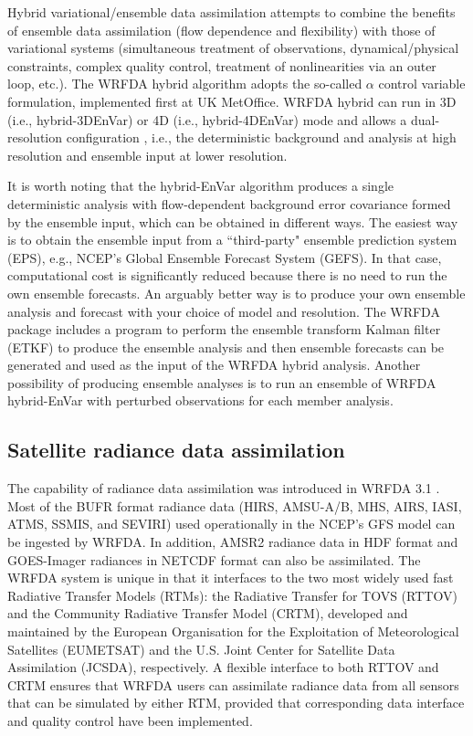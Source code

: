 Hybrid variational/ensemble data assimilation attempts to combine the benefits of ensemble data assimilation 
(flow dependence and flexibility) with those of variational systems (simultaneous treatment of observations,
dynamical/physical constraints, complex quality control, treatment of nonlinearities via an outer
loop, etc.). The WRFDA hybrid algorithm \citep{wang08a, wang08b} adopts the so-called $\alpha$ control variable formulation, 
implemented first at UK MetOffice. WRFDA hybrid can run in 3D (i.e., hybrid-3DEnVar) or 
4D (i.e., hybrid-4DEnVar) mode and allows a dual-resolution configuration \citep{schwartz15}, i.e., the deterministic
background and analysis at high resolution and ensemble input at lower resolution. 

It is worth noting that the hybrid-EnVar algorithm produces a single deterministic analysis with flow-dependent background
error covariance formed by the ensemble input, which can be obtained in different ways.
The easiest way is to obtain the ensemble input from a ``third-party" ensemble prediction system (EPS), e.g.,
NCEP's Global Ensemble Forecast System (GEFS). In that case, computational cost is significantly reduced
because there is no need to run the own ensemble forecasts.
An arguably better way is to produce your own ensemble analysis and forecast with your choice of model and resolution.
The WRFDA package includes a program to perform the ensemble transform Kalman filter (ETKF) to produce the ensemble
analysis and then ensemble forecasts can be generated and used as the input of the WRFDA hybrid analysis.
Another possibility of producing ensemble analyses is to run an ensemble of WRFDA hybrid-EnVar with perturbed observations for each member analysis.

\subsection{Satellite radiance data assimilation}

The capability of radiance data assimilation was introduced in WRFDA 3.1 \citep{liu06}.
Most of the BUFR format radiance data (HIRS, AMSU-A/B, MHS, AIRS, IASI, ATMS, SSMIS, and SEVIRI) 
used operationally in the NCEP's GFS model can be ingested by WRFDA. In addition, AMSR2 radiance data
in HDF format \citep{yang16} and GOES-Imager radiances in NETCDF format \citep{yang17} can also be assimilated.
The WRFDA system is unique in that it interfaces to the two most widely used fast Radiative Transfer Models (RTMs): 
the Radiative Transfer for TOVS (RTTOV) and the Community Radiative Transfer Model (CRTM),
 developed and maintained by the European Organisation for the Exploitation of Meteorological Satellites (EUMETSAT) and
the U.S. Joint Center for Satellite Data Assimilation (JCSDA), respectively. A flexible interface to both RTTOV and CRTM
ensures that WRFDA users can assimilate radiance data from all sensors that can be simulated by either
RTM, provided that corresponding data interface and quality control have been implemented.

